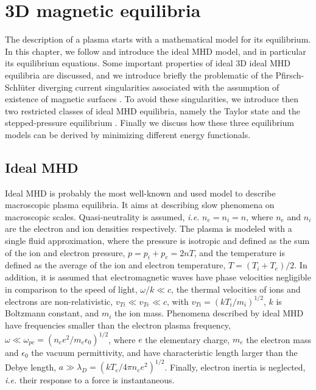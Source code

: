 \documentclass[my_thesis.tex]{subfiles}
\begin{document}
\chapter{3D magnetic equilibria}
The description of a plasma starts with a mathematical model for its equilibrium. In this chapter, we follow \citet{Freidberg2014} and introduce the ideal MHD model, and in particular its equilibrium equations. Some important properties of ideal 3D ideal MHD equilibria are discussed, and we introduce briefly the problematic of the Pfirsch-Schl\"uter diverging current singularities associated with the assumption of existence of magnetic surfaces \citep{Grad1967}. To avoid these singularities, we introduce then two restricted classes of ideal MHD equilibria, namely the Taylor state \citep{Taylor1974,Taylor1986} and the stepped-pressure equilibrium \citep{Hole2006}. Finally we discuss how these three equilibrium models can be derived by minimizing different energy functionals.

\section{Ideal MHD}
\label{section ideal mhd}
Ideal \ac{MHD} is probably the most well-known and used model to describe macroscopic plasma equilibria. It aims at describing slow phenomena on macroscopic scales. Quasi-neutrality is assumed, \textit{i.e.} $n_e=n_i=n$, where $n_e$ and $n_i$ are the electron and ion densities respectively. The plasma is modeled with a single fluid approximation, where the pressure is isotropic and defined as the sum of the ion and electron pressure, $p=p_i+p_e=2nT$, and the temperature is defined as the average of the ion and electron temperature, $T=(T_i+T_e)/2$. In addition, it is assumed that electromagnetic waves have phase velocities negligible in comparison to the speed of light, $\omega/k\ll c$, the thermal velocities of ions and electrons are non-relativistic, $v_{Ti}\ll v_{Te}\ll c$, with $v_{Ti}=(kT_i/m_i)^{1/2}$, $k$ is Boltzmann constant, and $m_i$ the ion mass. Phenomena described by ideal MHD have frequencies smaller than the electron plasma frequency, $\omega\ll \omega_{pe}=(n_ee^2/m_e\epsilon_0)^{1/2}$, where $e$ the elementary charge, $m_e$ the electron mass and $\epsilon_0$ the vacuum permittivity, and have characteristic length larger than the Debye length, $a\gg \lambda_D=(kT_e/4\pi n_e e^2)^{1/2}$. Finally, electron inertia is neglected, \textit{i.e.} their response to a force is instantaneous.
\end{document}
